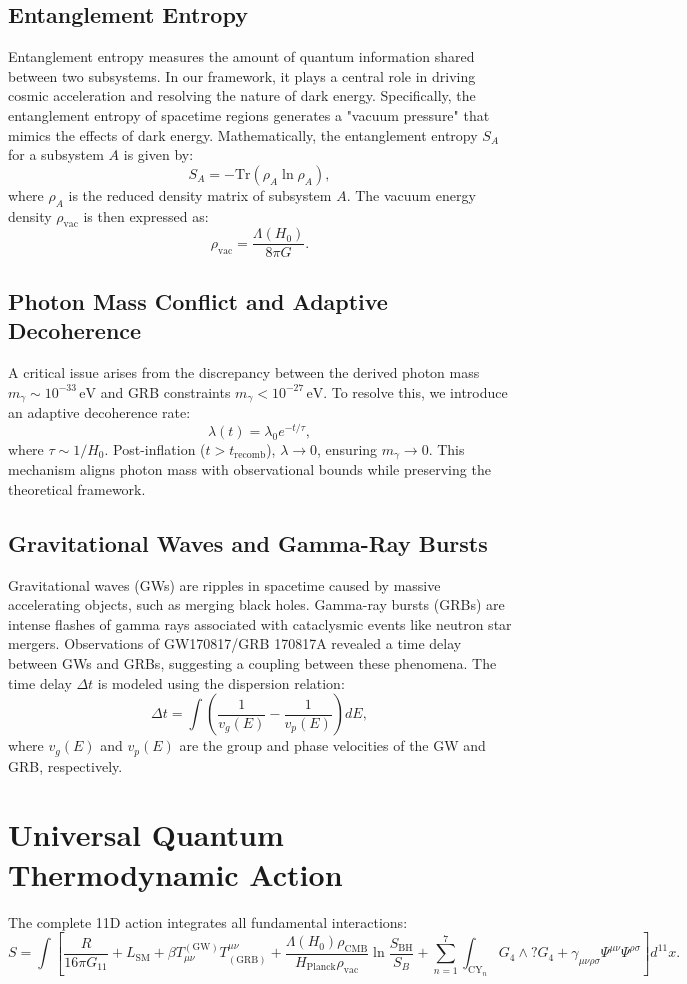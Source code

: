 \documentclass[12pt,a4paper]{article}
\begin{document}
\subsection{Entanglement Entropy}
Entanglement entropy measures the amount of quantum information shared between two subsystems. In our framework, it plays a central role in driving cosmic acceleration and resolving the nature of dark energy. Specifically, the entanglement entropy of spacetime regions generates a "vacuum pressure" that mimics the effects of dark energy. Mathematically, the entanglement entropy $S_A$ for a subsystem $A$ is given by:
\[
S_A = -\text{Tr}(\rho_A \ln \rho_A),
\]
where $\rho_A$ is the reduced density matrix of subsystem $A$. The vacuum energy density $\rho_{\text{vac}}$ is then expressed as:
\[
\rho_{\text{vac}} = \frac{\Lambda(H_0)}{8\pi G}.
\]

\subsection{Photon Mass Conflict and Adaptive Decoherence}
A critical issue arises from the discrepancy between the derived photon mass $m_\gamma \sim 10^{-33} \, \text{eV}$ and GRB constraints $m_\gamma < 10^{-27} \, \text{eV}$. To resolve this, we introduce an adaptive decoherence rate:
\[
\lambda(t) = \lambda_0 e^{-t/\tau},
\]
where $\tau \sim 1/H_0$. Post-inflation ($t > t_{\text{recomb}}$), $\lambda \to 0$, ensuring $m_\gamma \to 0$. This mechanism aligns photon mass with observational bounds while preserving the theoretical framework.

\subsection{Gravitational Waves and Gamma-Ray Bursts}
Gravitational waves (GWs) are ripples in spacetime caused by massive accelerating objects, such as merging black holes. Gamma-ray bursts (GRBs) are intense flashes of gamma rays associated with cataclysmic events like neutron star mergers. Observations of GW170817/GRB 170817A revealed a time delay between GWs and GRBs, suggesting a coupling between these phenomena. The time delay $\Delta t$ is modeled using the dispersion relation:
\[
\Delta t = \int \left( \frac{1}{v_g(E)} - \frac{1}{v_p(E)} \right) dE,
\]
where $v_g(E)$ and $v_p(E)$ are the group and phase velocities of the GW and GRB, respectively.

\section{Universal Quantum Thermodynamic Action}
The complete 11D action integrates all fundamental interactions:
\[
S = \int \left[ \frac{R}{16\pi G_{11}} + L_{\text{SM}} + \beta T_{\mu\nu}^{(\text{GW})} T^{\mu\nu}_{(\text{GRB})} + \frac{\Lambda(H_0) \rho_{\text{CMB}}}{H_{\text{Planck}} \rho_{\text{vac}}} \ln \frac{S_{\text{BH}}}{S_B} + \sum_{n=1}^7 \int_{\text{CY}_n} G_4 \wedge ?G_4 + \gamma_{\mu\nu\rho\sigma} \Psi^{\mu\nu} \Psi^{\rho\sigma} \right] d^{11}x.
\]
\end{document}
